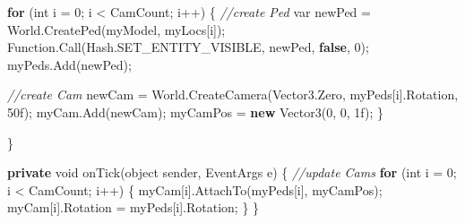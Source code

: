 \documentclass[
  openany]{book}
\newenvironment{Shaded}{\begin{snugshade}}{\end{snugshade}}
\newcommand{\CommentTok}[1]{\textcolor[rgb]{0.56,0.35,0.01}{\textit{#1}}}
\newcommand{\DataTypeTok}[1]{\textcolor[rgb]{0.13,0.29,0.53}{#1}}
\newcommand{\DecValTok}[1]{\textcolor[rgb]{0.00,0.00,0.81}{#1}}
\newcommand{\FunctionTok}[1]{\textcolor[rgb]{0.00,0.00,0.00}{#1}}
\newcommand{\KeywordTok}[1]{\textcolor[rgb]{0.13,0.29,0.53}{\textbf{#1}}}
\newcommand{\NormalTok}[1]{#1}
\begin{document}
\begin{Shaded}
\begin{Highlighting}[]
            \KeywordTok{for}\NormalTok{ (}\DataTypeTok{int}\NormalTok{ i = }\DecValTok{0}\NormalTok{; i < CamCount; i++)}
\NormalTok{            \{}
                \CommentTok{//create Ped}
                \DataTypeTok{var}\NormalTok{ newPed = World.}\FunctionTok{CreatePed}\NormalTok{(myModel, myLocs[i]);}
\NormalTok{                Function.}\FunctionTok{Call}\NormalTok{(Hash.}\FunctionTok{SET_ENTITY_VISIBLE}\NormalTok{, newPed, }\KeywordTok{false}\NormalTok{, }\DecValTok{0}\NormalTok{);}
\NormalTok{                myPeds.}\FunctionTok{Add}\NormalTok{(newPed);}

                \CommentTok{//create Cam}
\NormalTok{                newCam = World.}\FunctionTok{CreateCamera}\NormalTok{(Vector3.}\FunctionTok{Zero}\NormalTok{, myPeds[i].}\FunctionTok{Rotation}\NormalTok{, 50f);}
\NormalTok{                myCam.}\FunctionTok{Add}\NormalTok{(newCam);}
\NormalTok{                myCamPos = }\KeywordTok{new} \FunctionTok{Vector3}\NormalTok{(}\DecValTok{0}\NormalTok{, }\DecValTok{0}\NormalTok{, 1f);}
\NormalTok{            \}}
            
\NormalTok{        \}}

        \KeywordTok{private} \DataTypeTok{void} \FunctionTok{onTick}\NormalTok{(}\DataTypeTok{object}\NormalTok{ sender, EventArgs e)}
\NormalTok{        \{}
            \CommentTok{//update Cams}
            \KeywordTok{for}\NormalTok{ (}\DataTypeTok{int}\NormalTok{ i = }\DecValTok{0}\NormalTok{; i < CamCount; i++)}
\NormalTok{            \{}
\NormalTok{                myCam[i].}\FunctionTok{AttachTo}\NormalTok{(myPeds[i], myCamPos);}
\NormalTok{                myCam[i].}\FunctionTok{Rotation}\NormalTok{ = myPeds[i].}\FunctionTok{Rotation}\NormalTok{;}
\NormalTok{            \}}
\NormalTok{        \}}


\end{Highlighting}
\end{Shaded}
\end{document}
